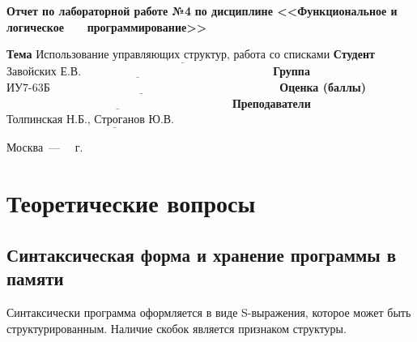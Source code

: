\documentclass[12pt]{report}
\begin{document}
\begin{titlepage}
		\begin{center}
			\noindent\begin{minipage}{1.1\textwidth}\centering
				\Large\textbf{  Отчет по лабораторной работе №4}\newline
				\textbf{по дисциплине <<Функциональное и логическое}\newline
				\textbf{~~~программирование>>}\newline\newline
			\end{minipage}
		\end{center}
		
		\noindent\textbf{Тема} $\underline{\text{Использование управляющих структур, работа со списками}}$\newline\newline
		\noindent\textbf{Студент} $\underline{\text{Завойских Е.В.~~~~~~~~~~~~~~~~~~~~~~~~~~~~~~~~~~~~~~~~~~~~~~~~~~}}$\newline\newline
		\noindent\textbf{Группа} $\underline{\text{ИУ7-63Б~~~~~~~~~~~~~~~~~~~~~~~~~~~~~~~~~~~~~~~~~~~~~~~~~~~~~~~~~~~~}}$\newline\newline
		\noindent\textbf{Оценка (баллы)} $\underline{\text{~~~~~~~~~~~~~~~~~~~~~~~~~~~~~~~~~~~~~~~~~~~~~~~~~~~~~~~~~~~}}$\newline\newline
		\noindent\textbf{Преподаватели} $\underline{\text{Толпинская Н.Б., Строганов Ю.В.~~~~~~~~~~~~~}}$\newline\newline\newline
		
		\begin{center}
			\vfill
			Москва~---~\the\year
			~г.
		\end{center}
	\end{titlepage}
	
\chapter{Теоретические вопросы}
	
\section{Синтаксическая форма и хранение программы в памяти}

Синтаксически программа оформляется в виде S-выражения, которое может быть структурированным. Наличие скобок является признаком структуры. 
\end{document}
